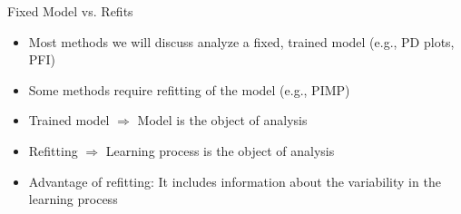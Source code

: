 \documentclass[11pt,compress,t,notes=noshow, aspectratio=169, xcolor=table]{beamer}
\newcommand\tab[1][1cm]{\hspace*{#1}}
\begin{document}



\begin{frame}{Fixed Model vs. Refits}
	\begin{itemize}
		\itemsep1em
		\item Most methods we will discuss analyze a fixed, trained model (e.g., PD plots, PFI)
		\item Some methods require refitting of the model (e.g., PIMP)
		\item Trained model $\Rightarrow$ Model is the object of analysis
		\item Refitting $\Rightarrow$ Learning process is the object of analysis
		\item Advantage of refitting: It includes information about the variability in the learning process
	\end{itemize}
\end{frame}
\end{document}
